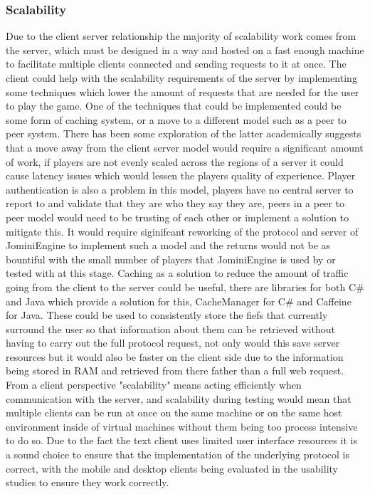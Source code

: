 \documentclass{article}
\begin{document}
	\subsubsection{Scalability}
	Due to the client server relationship the majority of scalability work comes from the server, which must be designed in a way and hosted on a fast enough machine to facilitate multiple clients connected and sending requests to it at once. The client could help with the scalability requirements of the server by implementing some techniques which lower the amount of requests that are needed for the user to play the game. One of the techniques that could be implemented could be some form of caching system, or a move to a different model such as a peer to peer system. There has been some exploration of the latter academically\cite{1354485} suggests that a move away from the client server model would require a significant amount of work, if players are not evenly scaled across the regions of a server it could cause latency issues which would lessen the players quality of experience. Player authentication is also a problem in this model, players have no central server to report to and validate that they are who they say they are, peers in a peer to peer model would need to be trusting of each other or implement a solution to mitigate this. It would require siginifcant reworking of the protocol and server of JominiEngine to implement such a model and the returns would not be as bountiful with the small number of players that JominiEngine is used by or tested with at this stage. Caching as a solution to reduce the amount of traffic going from the client to the server could be useful, there are libraries for both C\# and Java which provide a solution for this, CacheManager\cite{CacheManager} for C\# and Caffeine\cite{Caffeine} for Java. These could be used to consistently store the fiefs that currently surround the user so that information about them can be retrieved without having to carry out the full protocol request, not only would this save server resources but it would also be faster on the client side due to the information being stored in RAM and retrieved from there father than a full web request. From a client perspective "scalability" means acting efficiently when communication with the server, and scalability during testing would mean that multiple clients can be run at once on the same machine or on the same host environment inside of virtual machines without them being too process intensive to do so. Due to the fact the text client uses limited user interface resources it is a sound choice to ensure that the implementation of the underlying protocol is correct, with the mobile and desktop clients being evaluated in the usability studies to ensure they work correctly.
\end{document}
